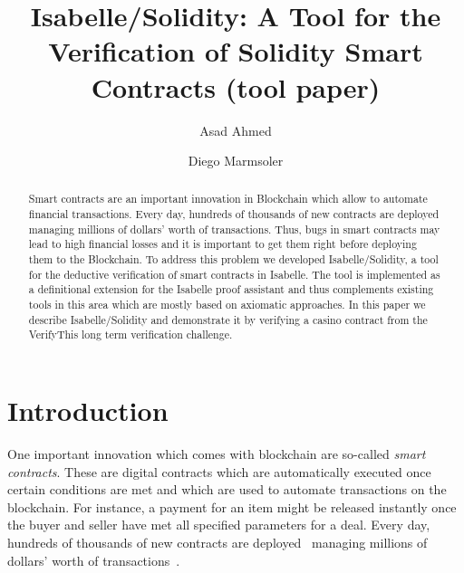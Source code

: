 \documentclass[a4paper,UKenglish,cleveref, autoref, thm-restate]{oasics-v2021}
\title{Isabelle/Solidity: A Tool  for the Verification of Solidity Smart Contracts (tool paper)} %
\author{Asad {Ahmed}}{University of Exeter, Exeter EX4 4PY, UK \and \url{https://sites.google.com/view/asad-ahmed/home} }{a.ahmed6@exeter.ac.uk}{https://orcid.org/0000-0001-8276-0975}{(Optional) author-specific funding acknowledgements}%
\author{Diego Marmsoler}{University of Exeter, Exeter EX4 4PY, UK}{d.marmsoler@exeter.ac.uk}{[https://orcid.org/0000−0003−2859−7673]}{[funding]}
\begin{document}
\maketitle

\begin{abstract}
	Smart contracts are an important innovation in Blockchain which allow to automate financial transactions.
	Every day, hundreds of thousands of new contracts are deployed managing millions of dollars' worth of transactions.
	Thus, bugs in smart contracts may lead to high financial losses and it is important to get them right before deploying them to the Blockchain.
	To address this problem we developed Isabelle/Solidity, a tool for the deductive verification of smart contracts in Isabelle.
	The tool is implemented as a definitional extension for the Isabelle proof assistant and thus complements existing tools in this area which are mostly based on axiomatic approaches.
	In this paper we describe Isabelle/Solidity and demonstrate it by verifying a casino contract from the VerifyThis long term verification challenge.
\end{abstract}

\section{Introduction}
\label{sec-intro}

One important innovation which comes with blockchain are so-called \emph{smart contracts}.
These are digital contracts which are automatically executed once certain conditions are met and which are used to automate transactions on the blockchain.
For instance, a payment for an item might be released instantly once the buyer and seller have met all specified parameters for a deal.
Every day, hundreds of thousands of new contracts are deployed~\cite{etherscan:contracts} managing millions of dollars' worth of transactions~\cite{ycharts:transactions}.
\end{document}
